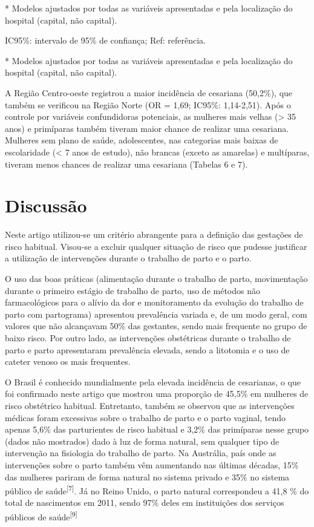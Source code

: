 \documentclass{article}
\begin{document}
* Modelos ajustados por todas as variáveis apresentadas e pela
localização do hospital (capital, não capital).

IC95\%: intervalo de 95\% de confiança; Ref: referência.

* Modelos ajustados por todas as variáveis apresentadas e pela
localização do hospital (capital, não capital).

A Região Centro-oeste registrou a maior incidência de cesariana (50,2\%), que
também
se verificou na Região Norte (OR = 1,69; IC95\%: 1,14-2,51). Após o controle por
variáveis confundidoras potenciais, as mulheres mais velhas (> 35 anos) e
primíparas também tiveram maior chance de realizar uma cesariana. Mulheres sem
plano
de saúde, adolescentes, nas categorias mais baixas de escolaridade (< 7 anos de
estudo), não brancas (exceto as amarelas) e multíparas, tiveram menos chances de
realizar uma cesariana (Tabelas 6 e 7).

\section{Discussão}

Neste artigo utilizou-se um critério abrangente para a definição das gestações
de
risco habitual. Visou-se a excluir qualquer situação de risco que pudesse
justificar
a utilização de intervenções durante o trabalho de parto e o parto.

O uso das boas práticas (alimentação durante o trabalho de parto, movimentação
durante o primeiro estágio de trabalho de parto, uso de métodos não
farmacológicos
para o alívio da dor e monitoramento da evolução do trabalho de parto com
partograma) apresentou prevalência variada e, de um modo geral, com valores que
não
alcançavam 50\% das gestantes, sendo mais frequente no grupo de baixo risco. Por
outro lado, as intervenções obstétricas durante o trabalho de parto e parto
apresentaram prevalência elevada, sendo a litotomia e o uso de cateter venoso os
mais frequentes.

O Brasil é conhecido mundialmente pela elevada incidência de cesarianas, o que
foi
confirmado neste artigo que mostrou uma proporção de 45,5\% em mulheres de risco
obstétrico habitual. Entretanto, também se observou que as intervenções médicas
foram excessivas sobre o trabalho de parto e o parto vaginal, tendo apenas 5,6\%
das
parturientes de risco habitual e 3,2\% das primíparas nesse grupo (dados não
mostrados) dado à luz de forma natural, sem qualquer tipo de intervenção na
fisiologia do trabalho de parto. Na Austrália, país onde as intervenções sobre o
parto também vêm aumentando nas últimas décadas, 15\% das mulheres pariram de
forma
natural no sistema privado e 35\% no sistema público de saúde\textsuperscript{[}\textsuperscript{7}\textsuperscript{]}. Já no Reino Unido, o parto natural correspondeu a
41,8 \% do total de nascimentos em 2011, sendo 97\% deles em instituições dos
serviços
públicos de saúde\textsuperscript{[}\textsuperscript{9}\textsuperscript{]}
\end{document}
